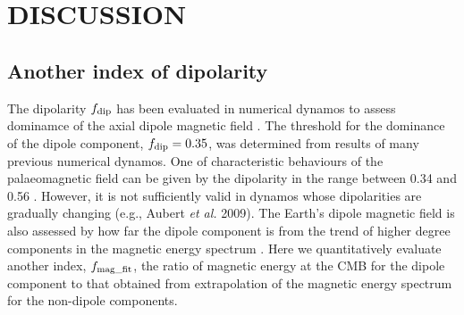 \section{DISCUSSION}
\subsection{Another index of dipolarity}
\label{subsec:dipolarity}



The dipolarity $f_{\rm dip}$ has been evaluated in numerical dynamos to assess dominamce of the axial dipole magnetic field \cite{Uli:2006,Soderlund:2012}.
The threshold for the dominance of the dipole component, $f_{\rm dip} = 0.35$, was determined from results of many previous numerical dynamos.
One of characteristic behaviours of the palaeomagnetic field can be given by the dipolarity in the range between 0.34 and 0.56 \cite{Meduri:2021}.
However, it is not sufficiently valid in dynamos whose dipolarities are gradually changing (e.g., Aubert {\it et al.} 2009).
The Earth's dipole magnetic field is also assessed by how far the dipole component is from the trend of higher degree components in the magnetic energy spectrum \cite{Lowes:1974,Langel:1982}.
Here we quantitatively evaluate 
another index, $f_{\rm mag\_fit}$, the ratio of magnetic energy at the CMB for the dipole component to that obtained from extrapolation of the magnetic energy spectrum for the non-dipole components.
